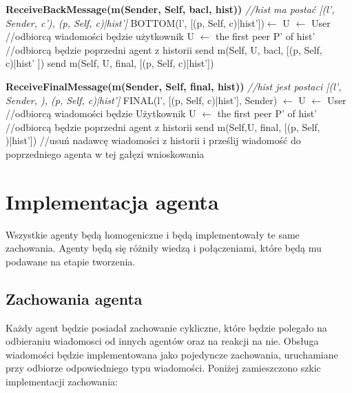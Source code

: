 \documentclass[a4paper,12pt]{mwart}
\begin{document}
\begin{algorithm}[H]
\begin{algorithmic}
\STATE \textbf{ReceiveBackMessage(m(Sender, Self, bacl, hist))}
\STATE \textit{//hist ma postać [(l', Sender, c'), (p, Self, c)|hist']}
\STATE BOTTOM(l', [(p, Self, c)|hist'])$\leftarrow$ \TRUE
{}
\STATE U $\leftarrow$ User //odbiorcą wiadomości będzie użytkownik
\ELSE
\STATE U $\leftarrow$ the first peer P' of hist' //odbiorcą będzie poprzedni agent z historii
\ENDIF
\STATE send m(Self, U, bacl, [(p, Self, c)|hist' ])
\STATE send m(Self, U, final, [(p, Self, c)|hist'])
\ENDIF
\end{algorithmic}
\end{algorithm}
\begin{algorithm}[H]
\begin{algorithmic}
\STATE \textbf{ReceiveFinalMessage(m(Sender, Self, final, hist))}
\STATE \textit{//hist jest postaci [(l', Sender, \TRUE), (p, Self, c)|hist']}
\STATE FINAL(l', [(p, Self, c)|hist'], Sender) $\leftarrow$ \TRUE
{}
\STATE U $\leftarrow$ User //odbiorcą wiadomości będzie Użytkownik
\ELSE
\STATE U $\leftarrow$ the first peer P' of hist' //odbiorcą będzie poprzedni agent z historii
\ENDIF
\ENDIF
\STATE send m(Self,U, final, [(p, Self, \TRUE)|hist']) //usuń nadawcę wiadomości z historii i prześlij wiadomość do poprzedniego agenta w tej gałęzi wnioskowania
\end{algorithmic}
\end{algorithm}
\section{Implementacja agenta}
Wszystkie agenty będą homogeniczne i będą implementowały te same zachowania. Agenty będą się różniły wiedzą i połączeniami, które będą mu podawane na etapie tworzenia.
\subsection{Zachowania agenta}
Każdy agent będzie posiadał zachowanie cykliczne, które będzie polegało na odbieraniu wiadomosci od innych agentów oraz na reakcji na nie. Obsługa wiadomości będzie implementowana jako pojedyncze zachowania, uruchamiane przy odbiorze odpowiedniego typu wiadomości. Poniżej zamieszczono szkic implementacji zachowania:
\end{document}

